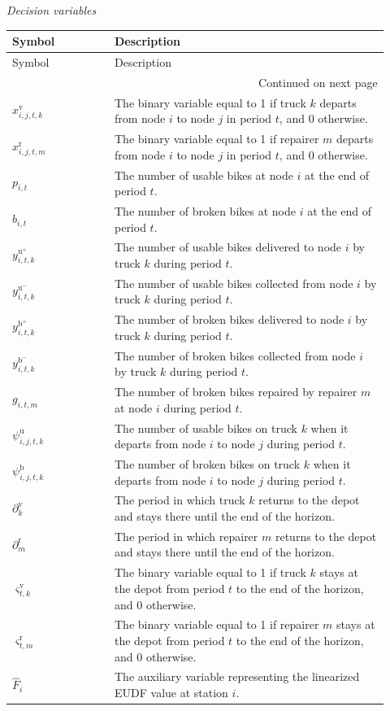 {\medskip
\noindent\textit{Decision variables}
\smallskip
\begin{longtable}{@{}p{0.25\linewidth}p{0.67\linewidth}@{}}
\toprule
Symbol & Description \\
\midrule
\endfirsthead
\toprule
Symbol & Description \\
\midrule
\endhead
\midrule
\multicolumn{2}{r}{Continued on next page}\\
\endfoot
\bottomrule
\endlastfoot
$x_{i,j,t,k}^{\mathrm{v}}$ & The binary variable equal to 1 if truck $k$ departs from node $i$ to node $j$ in period $t$, and 0 otherwise. \\
$x_{i,j,t,m}^{\mathrm{r}}$ & The binary variable equal to 1 if repairer $m$ departs from node $i$ to node $j$ in period $t$, and 0 otherwise. \\
$p_{i,t}$ & The number of usable bikes at node $i$ at the end of period $t$. \\
$b_{i,t}$ & The number of broken bikes at node $i$ at the end of period $t$. \\
$y_{i,t,k}^{\mathrm{u}^{+}}$ & The number of usable bikes delivered to node $i$ by truck $k$ during period $t$. \\
$y_{i,t,k}^{\mathrm{u}^{-}}$ & The number of usable bikes collected from node $i$ by truck $k$ during period $t$. \\
$y_{i,t,k}^{\mathrm{b}^{+}}$ & The number of broken bikes delivered to node $i$ by truck $k$ during period $t$. \\
$y_{i,t,k}^{\mathrm{b}^{-}}$ & The number of broken bikes collected from node $i$ by truck $k$ during period $t$. \\
$g_{i,t,m}$ & The number of broken bikes repaired by repairer $m$ at node $i$ during period $t$. \\
$\psi_{i,j,t,k}^{\mathrm{u}}$ & The number of usable bikes on truck $k$ when it departs from node $i$ to node $j$ during period $t$. \\
$\psi_{i,j,t,k}^{\mathrm{b}}$ & The number of broken bikes on truck $k$ when it departs from node $i$ to node $j$ during period $t$. \\
$\partial_k^{\mathrm{v}}$ & The period in which truck $k$ returns to the depot and stays there until the end of the horizon. \\
$\partial_m^{\mathrm{r}}$ & The period in which repairer $m$ returns to the depot and stays there until the end of the horizon. \\
$\varsigma_{t,k}^{\mathrm{v}}$ & The binary variable equal to 1 if truck $k$ stays at the depot from period $t$ to the end of the horizon, and 0 otherwise. \\
$\varsigma_{t,m}^{\mathrm{r}}$ & The binary variable equal to 1 if repairer $m$ stays at the depot from period $t$ to the end of the horizon, and 0 otherwise. \\
$\hat F_i$ & The auxiliary variable representing the linearized EUDF value at station $i$. \\
\end{longtable}
}

